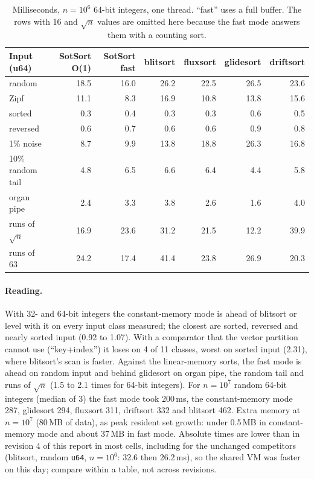 \documentclass[10pt,a4paper]{article}
\begin{document}
\begin{table}[t]\centering\small
\begin{tabular}{lrrrrrr}
\toprule
Input (u64) & SotSort O(1) & SotSort fast & blitsort & fluxsort & glidesort & driftsort\\
\midrule
random & 18.5 & 16.0 & 26.2 & 22.5 & 26.5 & 23.6\\
Zipf & 11.1 & 8.3 & 16.9 & 10.8 & 13.8 & 15.6\\
sorted & 0.3 & 0.4 & 0.3 & 0.3 & 0.6 & 0.5\\
reversed & 0.6 & 0.7 & 0.6 & 0.6 & 0.9 & 0.8\\
1\% noise & 8.7 & 9.9 & 13.8 & 18.8 & 26.3 & 16.8\\
10\% random tail & 4.8 & 6.5 & 6.6 & 6.4 & 4.4 & 5.8\\
organ pipe & 2.4 & 3.3 & 3.8 & 2.6 & 1.6 & 4.0\\
runs of $\sqrt n$ & 16.9 & 23.6 & 31.2 & 21.5 & 12.2 & 39.9\\
runs of 63 & 24.2 & 17.4 & 41.4 & 23.8 & 26.9 & 20.3\\
\bottomrule
\end{tabular}
\caption{Milliseconds, $n=10^6$ 64-bit integers, one thread. ``fast'' uses a full buffer. The
rows with 16 and $\sqrt n$ values are omitted here because the fast mode answers them with a
counting sort.}\label{tab:abs}
\end{table}

\paragraph{Reading.} With 32- and 64-bit integers the constant-memory mode is ahead of
blitsort or level with it on every input class measured; the closest are sorted,
reversed and nearly sorted input (0.92 to 1.07). With a comparator that the vector
partition cannot use (``key+index'') it loses on 4 of 11 classes, worst on sorted input
(2.31), where blitsort's scan is faster. Against the linear-memory sorts, the fast mode
is ahead on random input and behind glidesort on organ pipe, the random tail and runs of
$\sqrt n$ (1.5 to 2.1 times for 64-bit integers). For $n=10^7$ random 64-bit integers
(median of 3) the fast mode took 200\,ms, the constant-memory mode 287, glidesort 294,
fluxsort 311, driftsort 332 and blitsort 462. Extra memory at $n=10^7$ (80\,MB of data), as
peak resident set growth: under 0.5\,MB in constant-memory mode and about 37\,MB in fast mode.
Absolute times are lower than in revision 4 of this report in most cells, including for the
unchanged competitors (blitsort, random \texttt{u64}, $n=10^6$: 32.6 then 26.2\,ms), so the
shared VM was faster on this day; compare within a table, not across revisions.
\end{document}
